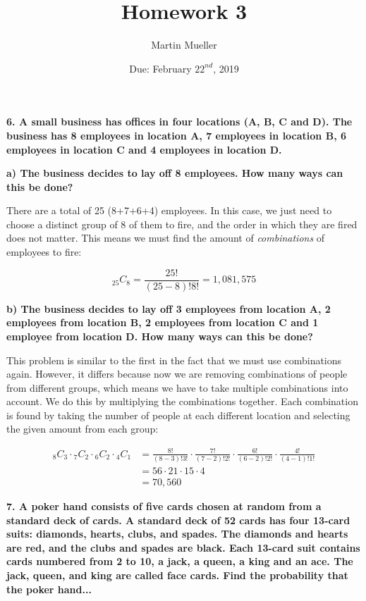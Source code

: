 \documentclass[12pt, letterpaper]{article}
\title{Homework 3}
\author{Martin Mueller}
\date{Due: February $22^{nd}$, 2019}
\begin{document}
\maketitle

\textbf{6. A small business has offices in four locations (A, B, C and D). The business has 8 employees in location A, 7 employees in location B, 6 employees in location C and 4 employees in location D.}

\qquad \textbf{a) The business decides to lay off 8 employees. How many ways can this be done?}
\begin{center}
	There are a total of 25 (8+7+6+4) employees. In this case, we just need to choose a distinct group of 8 of them to fire, and the order in which they are fired does not matter. This means we must find the amount of \textit{combinations} of employees to fire:
\end{center}
$${{}_{25}C_{8}} = \frac{25!}{(25-8)!8!} = \boxed{1,081,575}$$

\qquad \textbf{b) The business decides to lay off 3 employees from location A, 2 employees from location B, 2 employees from location C and 1 employee from location D. How many ways can this be done?}
\begin{center}
	This problem is similar to the first in the fact that we must use combinations again. However, it differs because now we are removing combinations of people from different groups, which means we have to take multiple combinations into account. We do this by multiplying the combinations together. Each combination is found by taking the number of people at each different location and selecting the given amount from each group:
\end{center}
\begin{align*}
	{{}_{8}C_{3}} \cdot {{}_{7}C_{2}} \cdot {{}_{6}C_{2}} \cdot {{}_{4}C_{1}} &= \frac{8!}{(8-3)!3!} \cdot \frac{7!}{(7-2)!2!} \cdot \frac{6!}{(6-2)!2!} \cdot \frac{4!}{(4-1)!1!} \\
		&= 56\cdot21\cdot15\cdot4 \\
		&= \boxed{70,560}
\end{align*}

\textbf{7. A poker hand consists of five cards chosen at random from a standard deck of cards. A standard deck of 52 cards has four 13-card suits: diamonds, hearts, clubs, and spades. The diamonds and hearts are red, and the clubs and spades are black. Each 13-card suit contains cards numbered from 2 to 10, a jack, a queen, a king and an ace. The jack, queen, and king are called face cards. Find the probability that the poker hand...}
\end{document}
